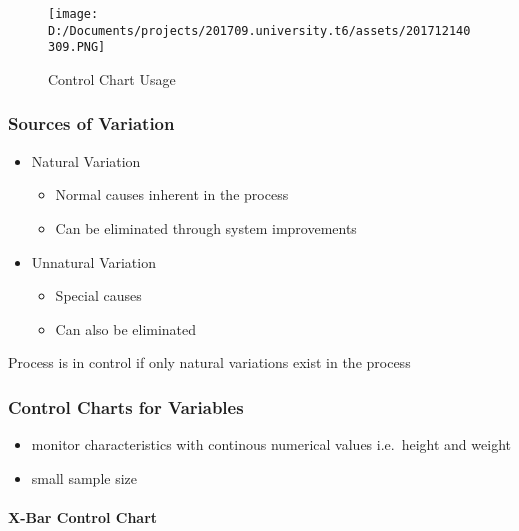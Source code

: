 \documentclass[11pt]{article}
\makeatletter
\def\maxwidth{\ifdim\Gin@nat@width>\linewidth\linewidth
    \else\Gin@nat@width\fi}
\let\Oldincludegraphics\includegraphics
\renewcommand{\includegraphics}[1]{\Oldincludegraphics[width=.8\maxwidth]{#1}}
\providecommand{\tightlist}{%
      \setlength{\itemsep}{0pt}\setlength{\parskip}{0pt}}
\makeatother
\begin{document}
\begin{figure}
\centering
\texttt{[image: D:/Documents/projects/201709.university.t6/assets/201712140309.PNG]}
\caption{Control Chart Usage}
\end{figure}

\hypertarget{sources-of-variation}{%
\subsubsection{Sources of Variation}\label{sources-of-variation}}

\begin{itemize}
\tightlist
\item
  Natural Variation

  \begin{itemize}
  \tightlist
  \item
    Normal causes inherent in the process
  \item
    Can be eliminated through system improvements
  \end{itemize}
\item
  Unnatural Variation

  \begin{itemize}
  \tightlist
  \item
    Special causes
  \item
    Can also be eliminated
  \end{itemize}
\end{itemize}

Process is in control if only natural variations exist in the process

\hypertarget{control-charts-for-variables}{%
\subsubsection{Control Charts for
Variables}\label{control-charts-for-variables}}

\begin{itemize}
\tightlist
\item
  monitor characteristics with continous numerical values i.e.~height
  and weight
\item
  small sample size
\end{itemize}

\hypertarget{x-bar-control-chart}{%
\paragraph{X-Bar Control Chart}\label{x-bar-control-chart}}
\end{document}
